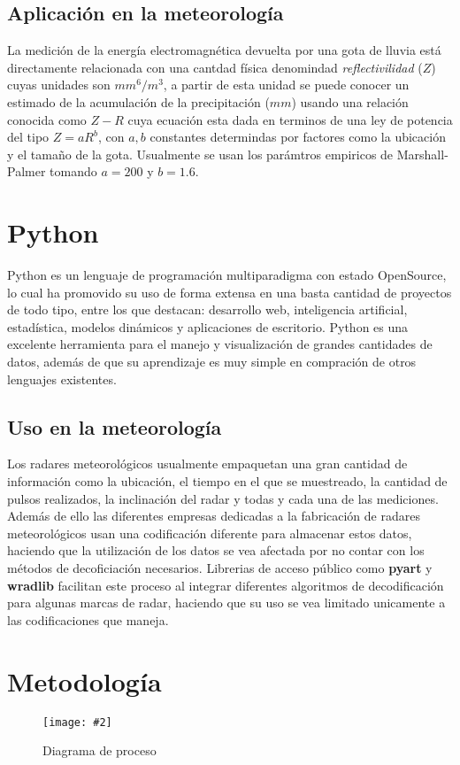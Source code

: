 \documentclass[letterpaper,12pt,oneside]{book}
\newcommand{\figura}[4]
{
  \begin{figure}[H]
    \centering
    \texttt{[image: \#2]}
    \caption{#3}
    \label{#4}
  \end{figure}
}
\begin{document}
    \section{Aplicación en la meteorología}
        La medición de la energía electromagnética devuelta por una gota de lluvia está directamente relacionada con una cantdad física denomindad \textit{reflectivilidad} ($Z$) cuyas unidades son $mm^6/m^3$, a partir de esta unidad se puede conocer un estimado de la acumulación de la precipitación ($mm$) usando una relación conocida como $Z-R$ cuya ecuación esta dada en terminos de una ley de potencia del tipo $Z= aR^b$, con $a,b$ constantes determindas por factores como la ubicación y el tamaño de la gota. Usualmente se usan los parámtros empiricos de Marshall-Palmer tomando $a=200$ y $b=1.6$.

\chapter{Python}
    Python es un lenguaje de programación multiparadigma con estado OpenSource, lo cual ha promovido su uso de forma extensa en una basta cantidad de proyectos de todo tipo, entre los que destacan: desarrollo web, inteligencia artificial, estadística, modelos dinámicos  y aplicaciones de escritorio.
    Python es una excelente herramienta para el manejo y visualización de grandes cantidades de datos, además de que su aprendizaje es muy simple en compración de otros lenguajes existentes. 
    \section{Uso en la meteorología}
        Los radares meteorológicos usualmente empaquetan una gran cantidad de información como la ubicación, el tiempo en el que se muestreado, la cantidad de pulsos realizados, la inclinación del radar y todas y cada una de las mediciones. 
        Además de ello las diferentes empresas dedicadas a la fabricación de radares meteorológicos usan una codificación diferente para almacenar estos datos, haciendo que la utilización de los datos se vea afectada por no contar con los métodos de decoficiación necesarios. 
        Librerias de acceso público como \textbf{pyart} y \textbf{wradlib} facilitan este proceso al integrar diferentes algoritmos de decodificación para algunas marcas de radar, haciendo que su uso se vea limitado unicamente a las codificaciones que maneja.

\chapter{Metodología}
    \figura{1}{/home/aceron/Documentos/GitHub/Tesis/docTesis/metodo.png}{Diagrama de proceso}{fig:fig1}
    
\nocite{*}



\backmatter%
\end{document}
